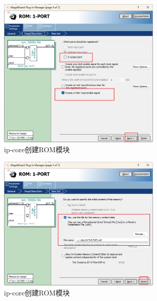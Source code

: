 \documentclass[UTF8]{article}
\theoremstyle{MyLineTheoremStyle} %
\theoremstyle{MyBlockTheoremStyle} %
\theoremstyle{MySubsubsectionStyle} %
\begin{document}
\begin{figure}[H]
    \centering
    \includegraphics[width=0.7\textwidth]{ip-core6.png}
    \caption{ip-core创建ROM模块}
    \label{fig:ip-core创建ROM模块5}
\end{figure}

\begin{figure}[H]
    \centering
    \includegraphics[width=0.7\textwidth]{ip-core7.png}
    \caption{ip-core创建ROM模块}
    \label{fig:ip-core创建ROM模块6}
\end{figure}
\end{document}
